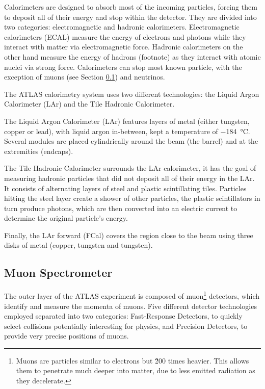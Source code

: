 Calorimeters are designed to absorb most of the incoming particles, forcing them to deposit all of their energy and stop within the detector. They are divided into two categories: electromagnetic and hadronic calorimeters. Electromagnetic calorimeters (ECAL) measure the energy of electrons and photons while they interact with matter via electromagnetic force. Hadronic calorimeters on the other hand measure the energy of hadrons (footnote) as they interact with atomic nuclei via strong force. Calorimeters can stop most known particle, with the exception of muons (see Section \ref{sec:muon_spectrometer}) and neutrinos.

The ATLAS calorimetry system uses two different technologies: the Liquid Argon Calorimeter (LAr) and the Tile Hadronic Calorimeter.

The Liquid Argon Calorimeter (LAr) features layers of metal (either tungsten, copper or lead), with liquid argon in-between, kept a temperature of \qty{-184}{\degreeCelsius}. Several modules are placed cylindrically around the beam (the barrel) and at the extremities (endcaps).

The Tile Hadronic Calorimeter surrounds the LAr calorimeter, it has the goal of measuring hadronic particles that did not deposit all of their energy in the LAr. It consists of alternating layers of steel and plastic scintillating tiles. Particles hitting the steel layer create a shower of other particles, the plastic scintillators in turn produce photons, which are then converted into an electric current to determine the original particle's energy.

Finally, the LAr forward (FCal) covers the region close to the beam using three disks of metal (copper, tungsten and tungsten).

\subsection{Muon Spectrometer}\label{sec:muon_spectrometer}

The outer layer of the ATLAS experiment is composed of muon\footnote{Muons are particles similar to electrons but \~200 times heavier. This allows them to penetrate much deeper into matter, due to less emitted radiation as they decelerate.} detectors, which identify and measure the momenta of muons. Five different detector technologies employed separated into two categories: Fast-Response Detectors, to quickly select collisions potentially interesting for physics, and Precision Detectors, to provide very precise positions of muons.

